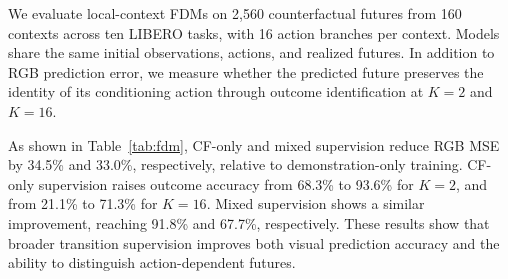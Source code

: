 We evaluate local-context FDMs on 2,560 counterfactual futures from
160 contexts across ten LIBERO tasks, with 16 action branches per context.
Models share the same initial observations, actions, and realized futures.
In addition to RGB prediction error, we measure whether the predicted future
preserves the identity of its conditioning action through outcome
identification at $K=2$ and $K=16$.

As shown in Table~\ref{tab:fdm}, CF-only and mixed supervision reduce RGB MSE
by 34.5\% and 33.0\%, respectively, relative to demonstration-only training.
CF-only supervision raises outcome accuracy from 68.3\% to 93.6\% for
$K=2$, and from 21.1\% to 71.3\% for $K=16$. Mixed supervision shows a
similar improvement, reaching 91.8\% and 67.7\%, respectively. These results
show that broader transition supervision improves both visual prediction
accuracy and the ability to distinguish action-dependent futures.